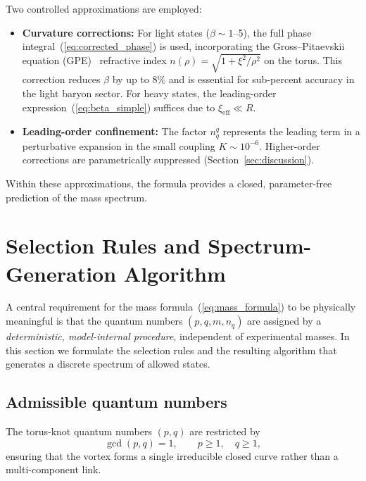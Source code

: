 \documentclass[11pt,a4paper]{article}
\begin{document}
Two controlled approximations are employed:

\begin{itemize}
  \item \textbf{Curvature corrections:} For light states
    ($\beta \sim 1$--5), the full phase
    integral~(\ref{eq:corrected_phase}) is used, incorporating
    the Gross--Pitaevskii equation (GPE)~\cite{Pismen} refractive
    index $n(\rho) = \sqrt{1 + \xi^2/\rho^2}$ on the torus.
    This correction reduces $\beta$ by up to $8\%$ and is essential
    for sub-percent accuracy in the light baryon sector.
    For heavy states, the leading-order
    expression~(\ref{eq:beta_simple}) suffices due to
    $\xi_{\mathrm{eff}} \ll R$.

  \item \textbf{Leading-order confinement:} The factor $n_q^q$
    represents the leading term in a perturbative expansion in the
    small coupling $K \sim 10^{-6}$.  Higher-order corrections are
    parametrically suppressed (Section~\ref{sec:discussion}).
\end{itemize}

Within these approximations, the formula provides a closed,
parameter-free prediction of the mass spectrum.


\section{Selection Rules and Spectrum-Generation Algorithm}
\label{sec:selection}

A central requirement for the mass formula~(\ref{eq:mass_formula})
to be physically meaningful is that the quantum numbers
$(p,q,m,n_q)$ are assigned by a \emph{deterministic, model-internal
procedure}, independent of experimental masses.  In this section we
formulate the selection rules and the resulting algorithm that
generates a discrete spectrum of allowed states.

\subsection{Admissible quantum numbers}

The torus-knot quantum numbers $(p,q)$ are restricted by
\begin{equation}
  \gcd(p,q) = 1, \qquad p \ge 1,\quad q \ge 1,
\end{equation}
ensuring that the vortex forms a single irreducible closed curve
rather than a multi-component link.
\end{document}
